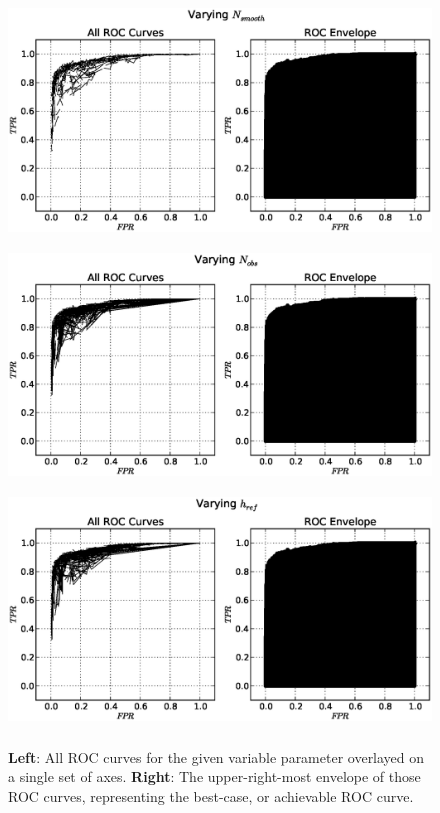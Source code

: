 \begin{figure}[!h]
\begin{center}
\includegraphics[height=2.5in]{../fig/final/roc_env/Nsmooth}
\includegraphics[height=2.5in]{../fig/final/roc_env/nobs}
\includegraphics[height=2.5in]{../fig/final/roc_env/href}
\end{center}
\caption{\label{fig:roc_env1}  {\bf Left}: All ROC curves for the given variable
  parameter overlayed on a single set of axes. {\bf Right}: The upper-right-most
  envelope of those ROC curves, representing the best-case, or achievable ROC
  curve.  }
\end{figure}

